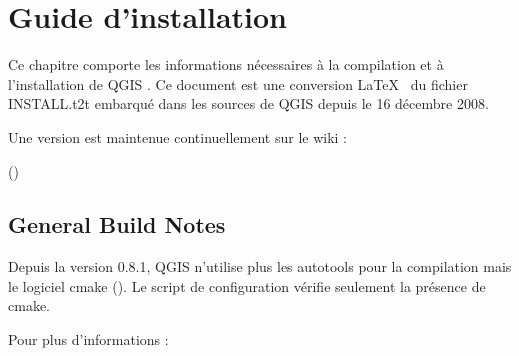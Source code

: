 \section{Guide d'installation}\label{label_install}

%
%

Ce chapitre comporte les informations n\'ecessaires \`a la compilation et \`a
l'installation de QGIS \CURRENT. Ce document est une conversion \LaTeX~ du
fichier INSTALL.t2t embarqu\'e dans les sources de QGIS depuis le 16 d\'ecembre
2008.

Une version est maintenue continuellement sur le wiki :

()
%
%  

\subsection{General Build Notes}
Depuis la version 0.8.1, QGIS n'utilise plus les autotools pour la compilation
mais le logiciel cmake
(). Le script de
configuration v\'erifie seulement la pr\'esence de cmake.

Pour plus d'informations :
  
